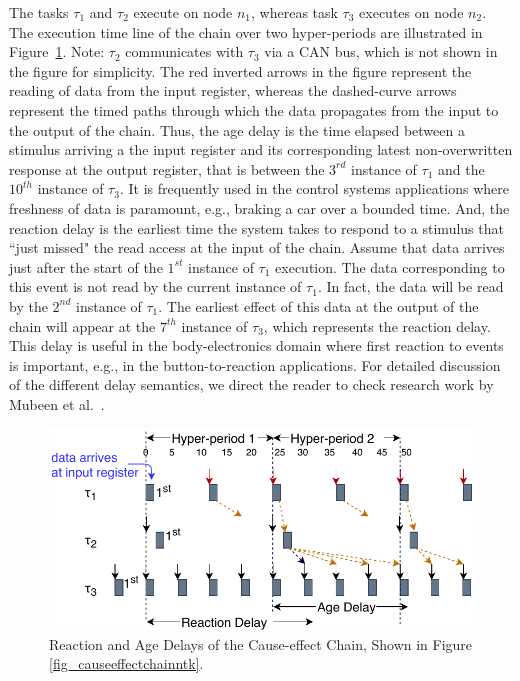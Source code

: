 {The tasks $\tau_1$ and $\tau_2$ execute on node $n_1$, whereas task $\tau_3$ executes on node $n_2$. The execution time line of the chain over two hyper-periods are illustrated in Figure~\ref{fig_timedchainntk}. Note: $\tau_2$ communicates with $\tau_3$ via a CAN bus, which is not shown in the figure for simplicity. The red inverted arrows in the figure represent the reading of data from the input register, whereas the dashed-curve arrows represent the timed paths through which the data propagates from the input to the output of the chain. Thus, the age delay is the time elapsed between a stimulus arriving a the input register and its corresponding latest non-overwritten response at the output register, that is between the $3^{rd}$ instance of  $\tau_1$  and the $10^{th}$ instance of $\tau_3$. It is frequently used in the control systems applications where freshness of data is paramount, e.g., braking a car over a bounded time. And, the reaction delay is the earliest time the system takes to respond to a stimulus that ``just missed" the read access at the input of the chain. Assume that data arrives just after the start of the $1^{st}$ instance of $\tau_1$ execution. The data corresponding to this event is not read by the current instance of $\tau_1$. In fact, the data will be read by the $2^{nd}$ instance of $\tau_1$. The earliest effect of this data at the output of the chain will appear at the $7^{th}$ instance of $\tau_3$, which represents the reaction delay. This delay is useful in the body-electronics domain where first reaction to events is important, e.g., in the button-to-reaction applications. For detailed discussion of the different delay semantics, we direct the reader to check research work by Mubeen et al.~\cite{mubeen2013support}. 
\begin{figure}
	\centering
	\includegraphics[width=0.9\linewidth]{img/timedchain_ntk}
	\caption{Reaction and Age Delays of the Cause-effect Chain, Shown in Figure {\ref{fig_causeeffectchainntk}}.}
	\label{fig_timedchainntk}
\end{figure}

}
